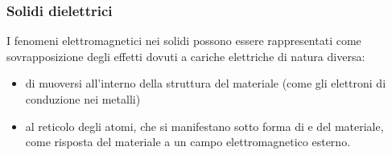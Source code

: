 \documentclass[letterpaper,10pt,italian]{jupyterBook}
\begin{document}
\subsubsection{Solidi dielettrici}
\label{\detokenize{ch/electromagnetism/electric-current:solidi-dielettrici}}\label{\detokenize{ch/electromagnetism/electric-current:physics-hs-electromagnetism-electric-current-solids-dielectric}}
\sphinxAtStartPar
I fenomeni elettromagnetici nei solidi possono essere rappresentati come sovrapposizione degli effetti dovuti a cariche elettriche di natura diversa:
\begin{itemize}
\item {} 
\sphinxAtStartPar
{} di muoversi all’interno della struttura del materiale (come gli elettroni di conduzione nei metalli)

\item {} 
\sphinxAtStartPar
{} al reticolo degli atomi, che si manifestano sotto forma di  e  del materiale, come risposta del materiale a un campo elettromagnetico esterno.

\end{itemize}

\sphinxAtStartPar
{}
\end{document}
